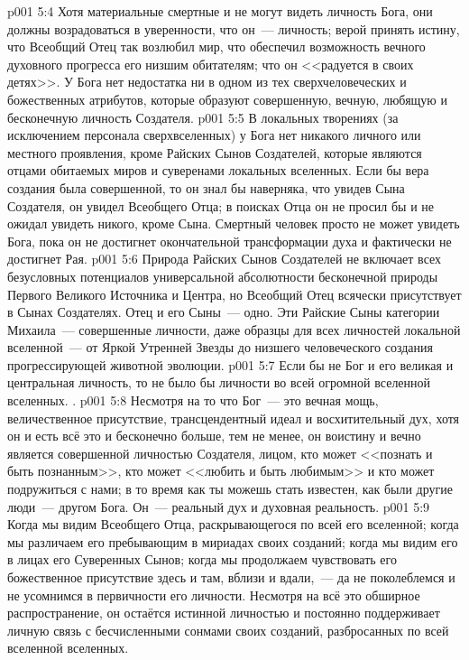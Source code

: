 \vs p001 5:4 Хотя материальные смертные и не могут видеть личность Бога, они должны возрадоваться в уверенности, что он~--- личность; верой принять истину, что Всеобщий Отец так возлюбил мир, что обеспечил возможность вечного духовного прогресса его низшим обитателям; что он <<радуется в своих детях>>. У Бога нет недостатка ни в одном из тех сверхчеловеческих и божественных атрибутов, которые образуют совершенную, вечную, любящую и бесконечную личность Создателя.
\vs p001 5:5 \pc В локальных творениях (за исключением персонала сверхвселенных) у Бога нет никакого личного или местного проявления, кроме Райских Сынов Создателей, которые являются отцами обитаемых миров и суверенами локальных вселенных. Если бы вера создания была совершенной, то он знал бы наверняка, что увидев Сына Создателя, он увидел Всеобщего Отца; в поисках Отца он не просил бы и не ожидал увидеть никого, кроме Сына. Смертный человек просто не может увидеть Бога, пока он не достигнет окончательной трансформации духа и фактически не достигнет Рая.
\vs p001 5:6 Природа Райских Сынов Создателей не включает всех безусловных потенциалов универсальной абсолютности бесконечной природы Первого Великого Источника и Центра, но Всеобщий Отец  всячески присутствует в Сынах Создателях. Отец и его Сыны~--- одно. Эти Райские Сыны категории Михаила~--- совершенные личности, даже образцы для всех личностей локальной вселенной~--- от Яркой Утренней Звезды до низшего человеческого создания прогрессирующей животной эволюции.
\vs p001 5:7 \pc Если бы не Бог и его великая и центральная личность, то не было бы личности во всей огромной вселенной вселенных. .
\vs p001 5:8 \pc Несмотря на то что Бог~--- это вечная мощь, величественное присутствие, трансцендентный идеал и восхитительный дух, хотя он и есть всё это и бесконечно больше, тем не менее, он воистину и вечно является совершенной личностью Создателя, лицом, кто может <<познать и быть познанным>>, кто может <<любить и быть любимым>> и кто может подружиться с нами; в то время как ты можешь стать известен, как были другие люди~--- другом Бога. Он~--- реальный дух и духовная реальность.
\vs p001 5:9 Когда мы видим Всеобщего Отца, раскрывающегося по всей его вселенной; когда мы различаем его пребывающим в мириадах своих созданий; когда мы видим его в лицах его Суверенных Сынов; когда мы продолжаем чувствовать его божественное присутствие здесь и там, вблизи и вдали,~--- да не поколеблемся и не усомнимся в первичности его личности. Несмотря на всё это обширное распространение, он остаётся истинной личностью и постоянно поддерживает личную связь с бесчисленными сонмами своих созданий, разбросанных по всей вселенной вселенных.
